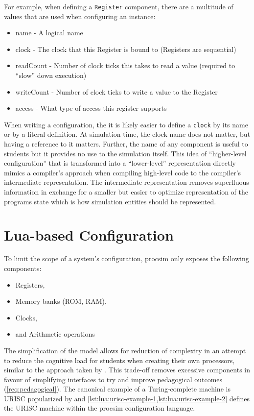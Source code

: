 For example, when defining a \verb|Register| component, there are a multitude of values that are used when configuring an instance: 
\begin{itemize}
\item name - A logical name
\item clock - The clock that this Register is bound to (Registers are sequential)
\item readCount - Number of clock ticks this takes to read a value (required to ``slow'' down execution)
\item writeCount - Number of clock ticks to write a value to the Register
\item access - What type of access this register supports
\end{itemize}
When writing a configuration, the it is likely easier to define a \verb|clock| by its name or by a literal definition. At simulation time, the clock name does not matter, but having a reference to it matters. Further, the name of any component is useful to students but it provides no use to the simulation itself. This idea of ``higher-level configuration'' that is transformed into a ``lower-level'' representation directly mimics a compiler's approach when compiling high-level code to the compiler's intermediate representation. The intermediate representation removes superfluous information in exchange for a smaller but easier to optimize representation of the programs state which is how simulation entities should be represented.



\section{Lua-based Configuration}

To limit the scope of a system's configuration, procsim only exposes the following components: 
\begin{itemize}
    \item Registers,
    \item Memory banks (ROM, RAM),
    \item Clocks,
    \item and Arithmetic operations
\end{itemize}
The simplification of the model allows for reduction of complexity in an attempt to reduce the cognitive load for students when creating their own processors, similar to the approach taken by \cite{Skrien2001,Garcia2009}. This trade-off removes excessive components in favour of simplifying interfaces to try and improve pedagogical outcomes (\cref{req:pedagogical}). The canonical example of a Turing-complete machine is URISC popularized by \cite{Mavaddat1988} and \cref{lst:lua:urisc-example-1,lst:lua:urisc-example-2} defines the URISC machine within the procsim configuration language.

